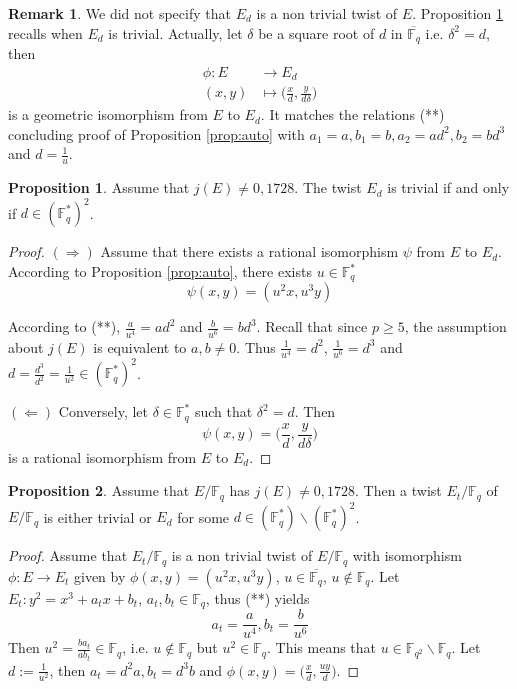 \documentclass[10pt]{article}
\theoremstyle{definition}
\newtheorem{proposition}{Proposition}
\newtheorem{remark}{Remark}
\newcommand{\F}{\mathbb{F}}
\begin{document}
\begin{remark}
We did not specify that $E_d$ is a non trivial twist of $E$.
Proposition \ref{prop:trivialtwist} recalls when $E_d$ is trivial.
Actually, let $\delta$ be a square root of $d$ in $\overline{\F_q}$ i.e. $\delta^2 = d$, then
\begin{align*}
\phi : E & \to E_d\\
      (x,y)& \mapsto \big(\frac{x}{d},\frac{y}{d\delta}\big)
\end{align*}
is a geometric isomorphism from $E$ to $E_d$.
It matches the relations (**) concluding proof of Proposition \ref{prop:auto} with $a_1=a, b_1=b, a_2 = ad^2, b_2=bd^3$ and $d = \frac1u$.
\end{remark}

\begin{proposition}\label{prop:trivialtwist}
Assume that $j(E) \neq 0,1728$.
The twist $E_d$ is trivial if and only if $d \in (\F_q^*)^2$.
\end{proposition}

\begin{proof}
$(\Rightarrow)$ Assume that there exists a rational isomorphism $\psi$ from $E$ to $E_d$.
According to Proposition \ref{prop:auto}, there exists $u \in \F_q^*$
\[ \psi(x,y) = (u^2x,u^3y) \]

According to (**), $\frac{a}{u^4} = ad^2$ and $\frac{b}{u^6} = bd^3$.
Recall that since $ p \geq 5$, the assumption about $j(E)$ is equivalent to $a,b \neq 0$.
Thus $\frac{1}{u^4} = d^2$, $\frac{1}{u^6} = d^3$ and $d = \frac{d^3}{d^2} = \frac{1}{u^2} \in (\F_q^*)^2$.

$(\Leftarrow)$ Conversely, let $\delta \in \F_q^*$ such that $\delta^2 = d$.
Then 
\[ \psi(x,y) = \big(\frac{x}{d},\frac{y}{d\delta}\big) \]
is a rational isomorphism from $E$ to $E_d$.
\end{proof}


\begin{proposition}
Assume that $E/\F_q$ has $j(E) \neq 0, 1728$. 
Then a twist $E_t/\F_q$ of $E/\F_q$ is either trivial or $E_d$ for some $d \in (\F_q^*) \backslash (\F_q^*)^2$.
\end{proposition}
\begin{proof}
Assume that $E_t/\F_q$ is a non trivial twist of $E/\F_q$ with isomorphism $\phi : E \to E_t$ given by $\phi(x,y) = (u^2x,u^3y)$, $u \in \overline{\F_q}$, $u \notin \F_q$.
Let $E_t : y^2 = x^3 +a_tx+b_t$, $a_t,b_t \in \F_q$, thus (**) yields
\[ a_t = \frac{a}{u^4}, b_t = \frac{b}{u^6} \]
Then $u^2 = \frac{ba_t}{ab_t} \in \F_q$, i.e. $u \notin \F_q$ but $u^2 \in \F_q$.
This means that $u \in \F_{q^2} \backslash \F_q$.
Let $d := \frac{1}{u^2}$, then $a_t = d^2a, b_t = d^3b$ and $\phi(x,y) = \big(\frac{x}{d},\frac{uy}{d} \big)$.
\end{proof}
\end{document}
